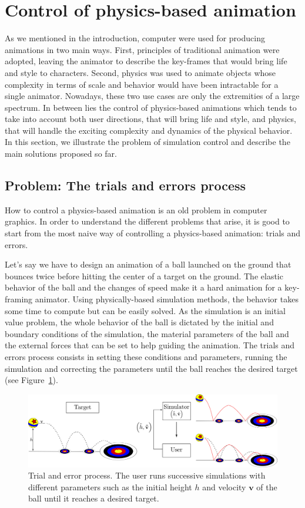 \section{Control of physics-based animation}
\label{sec:starSimulationControl}

As we mentioned in the introduction, computer were used for producing animations in two main ways. 
First, principles of traditional animation were adopted, leaving the animator to describe the key-frames that would bring life and style to characters. 
Second, physics was used to animate objects whose complexity in terms of scale and behavior would have been intractable for a single animator. 
Nowadays, these two use cases are only the extremities of a large spectrum. 
In between lies the control of physics-based animations which tends to take into account both user directions, that will bring life and style, and physics, that will handle the exciting complexity and dynamics of the physical behavior.
In this section, we illustrate the problem of simulation control and describe the main solutions proposed so far.
\subsection{Problem: The trials and errors process}
How to control a physics-based animation is an old problem in computer graphics. In order to understand the different problems that arise, it is good to start from the most naive way of controlling a physics-based animation: trials and errors. 

Let's say we have to design an animation of a ball launched on the ground that bounces twice before hitting the center of a target on the ground. 
The elastic behavior of the ball and the changes of speed make it a hard animation for a key-framing animator. 
Using physically-based simulation methods, the behavior takes some time to compute but can be easily solved.
As the simulation is an initial value problem, the whole behavior of the ball is dictated by the initial and boundary conditions of the simulation, the material parameters of the ball and the external forces that can be set to help guiding the animation. 
The trials and errors process consists in setting these conditions and parameters, running the simulation and correcting the parameters until the ball reaches the desired target (see Figure~\ref{fig:trialErrorProcess}). 
\begin{figure}[!h]
	\centering
	\includegraphics[width=\linewidth]{./images/simulationControl/trialError.png}
	\caption[STAR control: Trial and error process]{\label{fig:trialErrorProcess}Trial and error process. 
	The user runs successive simulations with different parameters such as the initial height $h$ and velocity $\mathbf{v}$ of the ball until it reaches a desired target.}
\end{figure}


